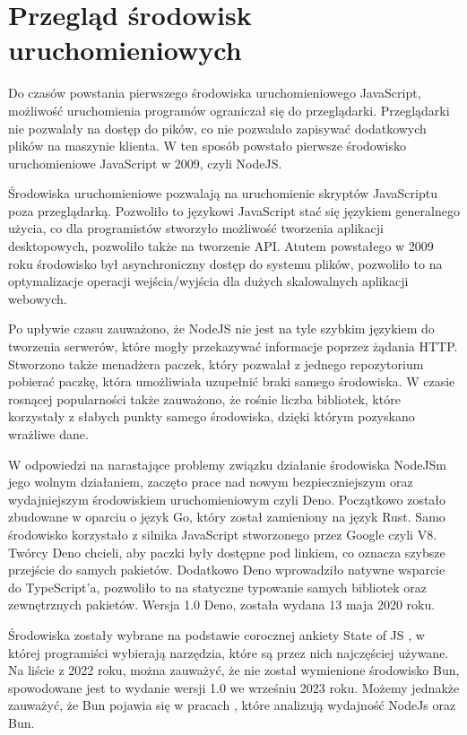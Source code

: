 \section*{Przegląd środowisk uruchomieniowych}
Do czasów powstania pierwszego środowiska uruchomieniowego JavaScript, możliwość uruchomienia programów ograniczał się do przeglądarki. Przeglądarki nie pozwalały na dostęp do pików, co nie pozwalało zapisywać dodatkowych plików na maszynie klienta. W ten sposób powstało pierwsze środowisko uruchomieniowe JavaScript w 2009, czyli NodeJS.

Środowiska uruchomieniowe pozwalają na uruchomienie skryptów JavaScriptu poza przeglądarką. Pozwoliło to językowi JavaScript stać się językiem generalnego użycia, co dla programistów stworzyło możliwość tworzenia aplikacji desktopowych, pozwoliło także na tworzenie API. Atutem powstałego w 2009 roku środowisko był asynchroniczny dostęp do systemu plików, pozwoliło to na optymalizacje operacji wejścia/wyjścia dla dużych skalowalnych aplikacji webowych.

Po upływie czasu zauważono, że NodeJS nie jest na tyle szybkim językiem do tworzenia serwerów, które mogły przekazywać informacje poprzez żądania HTTP. Stworzono także menadżera paczek, który pozwalał z jednego repozytorium pobierać paczkę, która umożliwiała uzupełnić braki samego środowiska. W czasie rosnącej popularności także zauważono, że rośnie liczba bibliotek, które korzystały z słabych punkty samego środowiska, dzięki którym pozyskano wrażliwe dane.

W odpowiedzi na narastające problemy związku działanie środowiska NodeJSm jego wolnym działaniem, zaczęto prace nad nowym bezpieczniejszym oraz wydajniejszym środowiskiem uruchomieniowym czyli Deno. Początkowo zostało zbudowane w oparciu o język Go, który został zamieniony na język Rust. Samo środowisko korzystało z silnika JavaScript stworzonego przez Google czyli V8. Twórcy Deno chcieli, aby paczki były dostępne pod linkiem, co oznacza szybsze przejście do samych pakietów. Dodatkowo Deno wprowadziło natywne wsparcie do TypeScript'a, pozwoliło to na statyczne typowanie samych bibliotek oraz zewnętrznych pakietów. Wersja 1.0 Deno, została wydana 13 maja 2020 roku.

Środowiska zostały wybrane na podstawie corocznej ankiety State of JS \cite{State_of_js:2022}, w której programiści wybierają narzędzia, które są przez nich najczęściej używane. Na liście z 2022 roku, można zauważyć, że nie został wymienione środowisko Bun,  spowodowane jest to wydanie wersji 1.0 we wrześniu 2023 roku. Możemy jednakże zauważyć, że Bun pojawia się w pracach \cite{NodeAndBun}, które analizują wydajność NodeJs oraz Bun.


